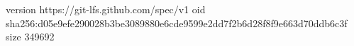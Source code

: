version https://git-lfs.github.com/spec/v1
oid sha256:d05e9efe290028b3be3089880e6cde9599e2dd7f2b6d28f8f9e663d70ddb6c3f
size 349692
